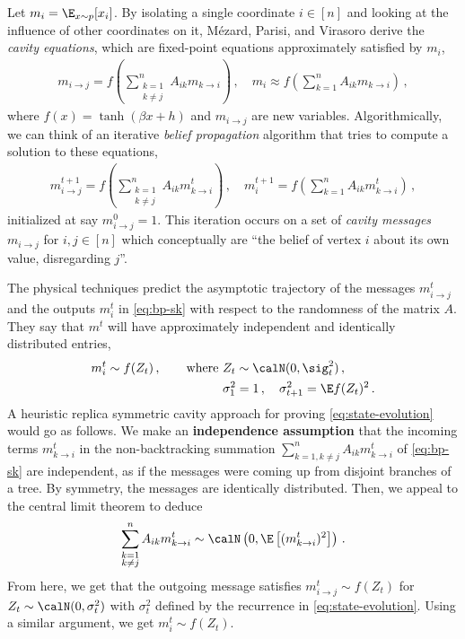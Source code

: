 \documentclass[12pt]{article}
\begin{document}
Let $m_i = \E_{x \sim p}[x_i]$. By isolating a single coordinate $i\in [n]$ and looking at the influence of other coordinates on it,  Mézard, Parisi, and Virasoro derive 
the {\em cavity equations}, which are fixed-point equations approximately satisfied by $m_i$,
\begin{align}
    m_{i\to j} = f\left(\sum_{\substack{k=1\\k\neq j}}^n A_{ik} m_{k\to i}\right)\,,\quad m_i \approx f\left(\sum_{k=1}^n A_{ik} m_{k\to i}\right)\,,\label{eq:cavity-equations}
\end{align}
where $f(x)=\tanh(\beta x+h)$ and $m_{i \to j}$ are new variables. Algorithmically,  we can think of an iterative \emph{belief propagation} algorithm that tries to compute a solution to these equations,
\begin{align}
    m_{i\to j}^{t+1} = f\left(\sum_{\substack{k=1\\k\neq j}}^n A_{ik} m_{k\to i}^t\right)\,,\quad m_i^{t+1} = f\left(\sum_{k=1}^n A_{ik} m_{k\to i}^t\right)\,,\label{eq:bp-sk}
\end{align}
initialized at say $m_{i \to j}^0 = 1$.
This iteration occurs on a set of {\em cavity messages} $m_{i \to j}$ for $i,j \in [n]$
which conceptually
are ``the belief of vertex $i$ about its own value, disregarding $j$''.

The physical techniques predict the asymptotic trajectory of the messages
$m^t_{i \to j}$ and the outputs $m_i^t$ in \cref{eq:bp-sk} with respect to the randomness of the matrix $A$.
They say that $m^t$ will have approximately 
independent and identically distributed entries,
\begin{align}
    m^t_i \sim {f}(Z_t)\,, \qquad \text{where } & Z_t \sim \calN(0, \sig_t^2)\,,\nonumber\\
    &\sigma_1^2 = 1\,,\quad  \sigma_{t+1}^2 = \E f(Z_t)^2\,.\label{eq:state-evolution}
\end{align}
A heuristic replica symmetric cavity approach for proving \cref{eq:state-evolution} would go as follows.
We make an \textbf{independence assumption} that the incoming terms $m_{k \to i}^t$ in the non-backtracking summation $\sum_{k = 1, k \neq j}^n A_{ik}m_{k \to i}^t$
of \cref{eq:bp-sk} are independent, as if the
messages were coming up from disjoint branches of a tree.
By symmetry, the messages are identically distributed.
Then, we appeal to the central limit theorem to deduce
\[ 
    \sum_{\substack{k = 1\\ k \neq j}}^n A_{ik}m_{k \to i}^t \sim \calN\left(0, \E\left[(m_{k \to i}^t)^2\right]\right)\,
.\]
From here, we get that the outgoing message satisfies $m_{i \to j}^t \sim f(Z_t)$ for $Z_t \sim \calN(0, \sigma_t^2)$
with $\sigma_t^2$ defined by the recurrence in \cref{eq:state-evolution}.
Using a similar argument, we get $m_i^t \sim {f}(Z_t)$. 
\end{document}
